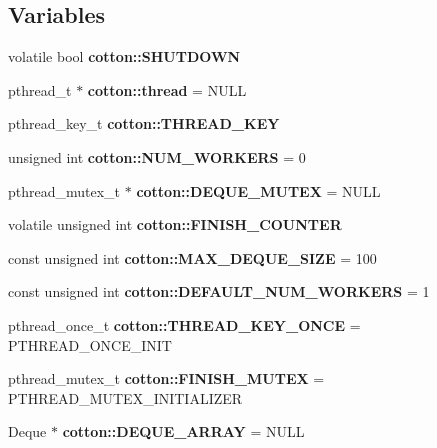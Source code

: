 \subsection*{Variables}
\begin{DoxyCompactItemize}
\item 
\mbox{\label{cotton-runtime_8h_ad72043de8ba79ff3385abd67fd1b15bf}} 
volatile bool {\bfseries cotton\+::\+S\+H\+U\+T\+D\+O\+WN}
\item 
\mbox{\label{cotton-runtime_8h_ae1c243496d4cac35fb6d8fb6be14b0f3}} 
pthread\+\_\+t $\ast$ {\bfseries cotton\+::thread} = N\+U\+LL
\item 
\mbox{\label{cotton-runtime_8h_a41bafde742c3ac2e3f360be9a8b2926d}} 
pthread\+\_\+key\+\_\+t {\bfseries cotton\+::\+T\+H\+R\+E\+A\+D\+\_\+\+K\+EY}
\item 
\mbox{\label{cotton-runtime_8h_a0d692d5b7c9fbd1d4999ed8270ebcce0}} 
unsigned int {\bfseries cotton\+::\+N\+U\+M\+\_\+\+W\+O\+R\+K\+E\+RS} = 0
\item 
\mbox{\label{cotton-runtime_8h_a71daeb136715fb167bda82ac84373091}} 
pthread\+\_\+mutex\+\_\+t $\ast$ {\bfseries cotton\+::\+D\+E\+Q\+U\+E\+\_\+\+M\+U\+T\+EX} = N\+U\+LL
\item 
\mbox{\label{cotton-runtime_8h_a8c3fa2e0febd6194c6c2e1b8274e3b6a}} 
volatile unsigned int {\bfseries cotton\+::\+F\+I\+N\+I\+S\+H\+\_\+\+C\+O\+U\+N\+T\+ER}
\item 
\mbox{\label{cotton-runtime_8h_abc469e68d18d644b538f6f16335fb5c4}} 
const unsigned int {\bfseries cotton\+::\+M\+A\+X\+\_\+\+D\+E\+Q\+U\+E\+\_\+\+S\+I\+ZE} = 100
\item 
\mbox{\label{cotton-runtime_8h_a261cb084089447eb9c2bab5c95891795}} 
const unsigned int {\bfseries cotton\+::\+D\+E\+F\+A\+U\+L\+T\+\_\+\+N\+U\+M\+\_\+\+W\+O\+R\+K\+E\+RS} = 1
\item 
\mbox{\label{cotton-runtime_8h_a49aaf0b0bc093f68bcc20907ff338827}} 
pthread\+\_\+once\+\_\+t {\bfseries cotton\+::\+T\+H\+R\+E\+A\+D\+\_\+\+K\+E\+Y\+\_\+\+O\+N\+CE} = P\+T\+H\+R\+E\+A\+D\+\_\+\+O\+N\+C\+E\+\_\+\+I\+N\+IT
\item 
\mbox{\label{cotton-runtime_8h_a0fa66e316877ba57e881d9c4fd193765}} 
pthread\+\_\+mutex\+\_\+t {\bfseries cotton\+::\+F\+I\+N\+I\+S\+H\+\_\+\+M\+U\+T\+EX} = P\+T\+H\+R\+E\+A\+D\+\_\+\+M\+U\+T\+E\+X\+\_\+\+I\+N\+I\+T\+I\+A\+L\+I\+Z\+ER
\item 
\mbox{\label{cotton-runtime_8h_a17e2506c45982338f909158a75592bd6}} 
Deque $\ast$ {\bfseries cotton\+::\+D\+E\+Q\+U\+E\+\_\+\+A\+R\+R\+AY} = N\+U\+LL
\end{DoxyCompactItemize}
